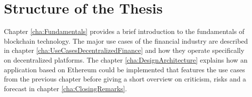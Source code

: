 \section{Structure of the Thesis}
Chapter \ref{cha:Fundamentals} provides a brief introduction to the fundamentals of blockchain technology. The major use cases of the
financial industry are described in chapter \ref{cha:UseCasesDecentralizedFinance} and how they operate specifically on decentralized
platforms. The chapter \ref{cha:DesignArchitecture} explains how an application based on Ethereum could be implemented that features
the use cases from the previous chapter before giving a short overview on criticism, risks and a forecast in chapter
\ref{cha:ClosingRemarks}.